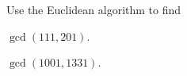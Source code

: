 
%
%
%

	Use the Euclidean algorithm to find
	\begin{subproblem}
		\skipitem
		\item $\gcd(111, 201)$.
		\item $\gcd(1001, 1331)$.
	\end{subproblem}

\solution
	\begin{subproblem}
		\skipitem
		\item 
		\item 
	\end{subproblem}
